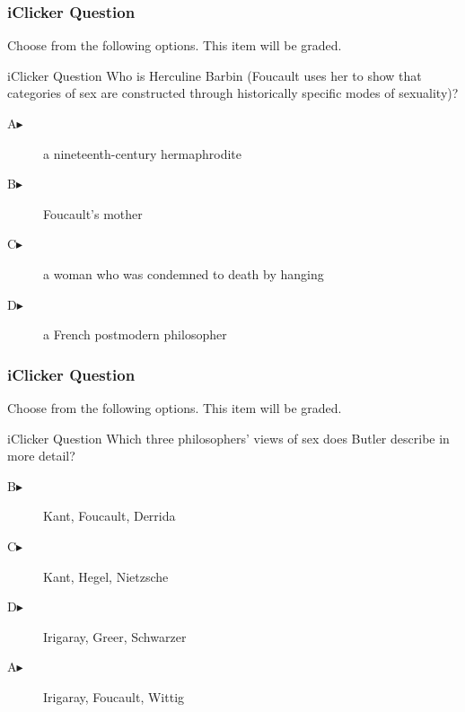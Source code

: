 \documentclass[xcolor=dvipsnames]{beamer}
\begin{document}
\begin{frame}
  \frametitle{iClicker Question}
Choose from the following options. This item will be graded.
\begin{block}{iClicker Question}
  Who is Herculine Barbin (Foucault uses her to show that categories
  of sex are constructed through historically specific modes of
  sexuality)?
\end{block}
\begin{description}
\item[A\hspace{.2in}$\blacktriangleright$] a nineteenth-century hermaphrodite
\item[B\hspace{.2in}$\blacktriangleright$] Foucault's mother
\item[C\hspace{.2in}$\blacktriangleright$] a woman who was condemned
  to death by hanging
\item[D\hspace{.2in}$\blacktriangleright$] a French postmodern philosopher
\end{description}
\end{frame}

\begin{frame}
  \frametitle{iClicker Question}
Choose from the following options. This item will be graded.
\begin{block}{iClicker Question}
Which three philosophers' views of sex does Butler describe in more detail?
\end{block}
\begin{description}
\item[B\hspace{.2in}$\blacktriangleright$] Kant, Foucault, Derrida
\item[C\hspace{.2in}$\blacktriangleright$] Kant, Hegel, Nietzsche
\item[D\hspace{.2in}$\blacktriangleright$] Irigaray, Greer, Schwarzer
\item[A\hspace{.2in}$\blacktriangleright$] Irigaray, Foucault, Wittig
\end{description}
\end{frame}
\end{document}
